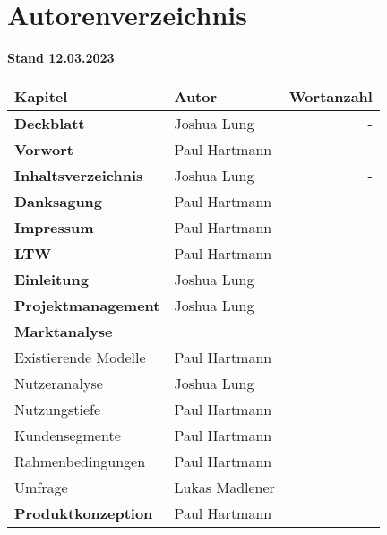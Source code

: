 \section{Autorenverzeichnis}

\textbf{Stand 12.03.2023}

\begin{table}[!h]
  \centering
  \begin{tabular}{l|l|r}
    \textbf{Kapitel}                       & \textbf{Autor} & \textbf{Wortanzahl} \\ \hline\hline
    \textbf{Deckblatt}                     & Joshua Lung    & -                   \\ \hline
    \textbf{Vorwort}                       & Paul Hartmann  &                     \\ \hline
    \textbf{Inhaltsverzeichnis}            & Joshua Lung    & -                   \\ \hline
    \textbf{Danksagung}                    & Paul Hartmann  &                     \\ \hline
    \textbf{Impressum}                     & Paul Hartmann  &                     \\ \hline
    \textbf{LTW}                           & Paul Hartmann  &                     \\ \hline
    \textbf{Einleitung}                    & Joshua Lung    &                     \\ \hline
    \textbf{Projektmanagement}             & Joshua Lung    &                     \\ \hline
    \textbf{Marktanalyse}                  &                &                     \\ \hline
    Existierende Modelle                   & Paul Hartmann  &                     \\ \hline
    Nutzeranalyse                          & Joshua Lung    &                     \\ \hline
    Nutzungstiefe                          & Paul Hartmann  &                     \\ \hline
    Kundensegmente                         & Paul Hartmann  &                     \\ \hline
    Rahmenbedingungen                      & Paul Hartmann  &                     \\ \hline
    Umfrage                                & Lukas Madlener &                     \\ \hline
    \textbf{Produktkonzeption}             & Paul Hartmann  &                     \\

\end{tabular}
\end{table}
